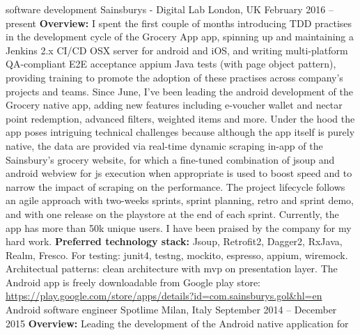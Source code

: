 \begin{cventries}
\cventry
{software development}
{Sainsburys - Digital Lab}
{London, UK}
{February 2016 -- present}
{%
   \textbf{Overview:}
   I spent the first couple  of months introducing TDD practises in the
   development cycle of the 
   Grocery App app, 
   spinning up and maintaining a Jenkins 2.x  CI/CD
   OSX server for android and iOS, and writing multi-platform QA-compliant
   E2E acceptance appium Java tests (with page object pattern),
    providing training to promote the adoption of
    these practises across company's projects and teams.
   Since June, I've been leading the android development of the Grocery 
   native app, adding new features including e-voucher wallet and nectar point
   redemption, advanced filters, weighted items and more.  Under the hood the
   app poses intriguing technical challenges because although the app itself is
   purely native, the data are provided via real-time dynamic scraping  in-app
   of the Sainsbury's grocery website, for which a fine-tuned combination of
   jsoup and android webview for js execution when appropriate is used to boost
   speed and to narrow the impact of scraping on the performance.  The project
   lifecycle follows an agile approach with two-weeks sprints, sprint planning,
   retro and sprint demo,  and with one
    release on the playstore at the end of each sprint.  Currently, the app has
    more than 50k unique users.
    \newline
    I have been praised by the company for my hard work. 
   \newline
    \textbf{Preferred technology stack:} Jsoup, Retrofit2, Dagger2, RxJava,
    Realm,
   Fresco. For testing: junit4, testng, mockito, espresso, appium, wiremock.
   Architectual patterns: clean architecture with mvp on presentation layer. 
   \newline The Android app is freely downloadable from Google play store:
   \url{https://play.google.com/store/apps/details?id=com.sainsburys.gol&hl=en}
}
\cventry
{Android software engineer}
{Spotlime}
{Milan, Italy}
{September 2014 -- December 2015 }
{
   \textbf{Overview:}
   Leading the 
   development of the 
   Android native application for 
}
\end{cventries}
